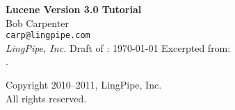 \documentclass[10pt]{book}
\begin{document}
\frontmatter
\pagestyle{empty}
\vspace*{1in}
\noindent
{\Huge\bf Lucene Version 3.0 Tutorial}
\\[1in]
{\LARGE Bob Carpenter}
\\[8pt]
{\large\tt carp@lingpipe.com}
\\[8pt]
{\large\it LingPipe, Inc.}
\hspace*{1in}
\vfill
{ }
\vfill
\noindent
Draft of : \today
\vfill
\noindent
Excerpted from:
\\[12pt]
\hspace*{-2pt}{\Large\it Text Analysis with LingPipe 4.0}.
\\[4pt]
%
\pagestyle{empty}
\clearpage
\hspace*{12pt}
\vfill
\begin{center}
{\small
Copyright 2010--2011, LingPipe, Inc.
\\
All rights reserved.}
\end{center}
\vfill
{}
\vfill
\pagestyle{empty}
\clearpage
\mainmatter
\pagestyle{fancy}

\end{document}
